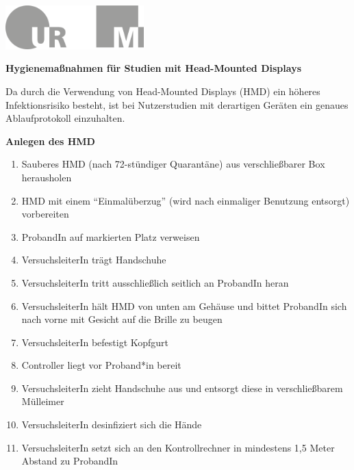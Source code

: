 \documentclass[24pt, a4paper, portrait]{article}
\begin{document}
\pagestyle{empty}

\raggedleft

\includegraphics[width=0.4\textwidth]{logo}

\vspace{1cm}
\sffamily
\centering
\huge

\textbf{Hygienemaßnahmen für Studien mit Head-Mounted Displays}

\vspace{1cm}

\raggedright
\Large

Da durch die Verwendung von Head-Mounted Displays (HMD) ein höheres Infektionsrisiko besteht, ist bei Nutzerstudien mit derartigen Geräten ein genaues Ablaufprotokoll einzuhalten.

\vspace{0.5cm}

\textbf{Anlegen des HMD}

\large

\begin{enumerate}
    \item Sauberes HMD (nach 72-stündiger Quarantäne) aus verschließbarer Box herausholen
    \item HMD mit einem “Einmalüberzug” (wird nach einmaliger Benutzung entsorgt) vorbereiten
    \item ProbandIn auf markierten Platz verweisen 
    \item VersuchsleiterIn trägt Handschuhe
    \item VersuchsleiterIn tritt ausschließlich seitlich an ProbandIn heran
    \item VersuchsleiterIn hält HMD von unten am Gehäuse und bittet ProbandIn sich nach vorne mit Gesicht auf die Brille zu beugen 
    \item VersuchsleiterIn befestigt Kopfgurt 
    \item Controller liegt vor Proband*in bereit 
    \item VersuchsleiterIn zieht Handschuhe aus und entsorgt diese in verschließbarem Mülleimer
    \item VersuchsleiterIn desinfiziert sich die Hände
    \item VersuchsleiterIn setzt sich an den Kontrollrechner in mindestens 1,5 Meter Abstand zu ProbandIn
\end{enumerate}
\end{document}
